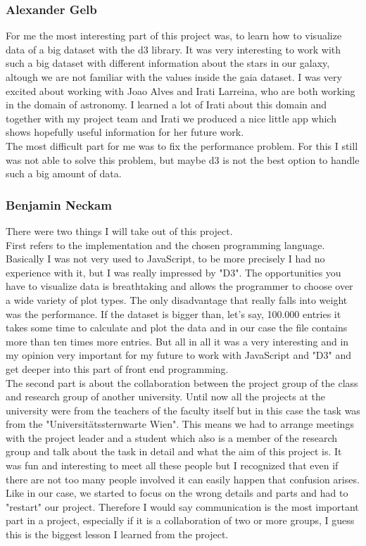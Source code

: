 \documentclass{vgtc}                          %
\begin{document}
\subsubsection{Alexander Gelb}
For me the most interesting part of this project was, to learn how to visualize data of a big dataset with the d3 library. It was very interesting to work with such a big dataset with different information about the stars in our galaxy, altough we are not familiar with the values inside the gaia dataset. I was very excited about working with Joao Alves and Irati Larreina, who are both working in the domain of astronomy. I learned a lot of Irati about this domain and together with my project team and Irati we produced a nice little app which shows hopefully useful information for her future work. \\
The most difficult part for me was to fix the performance problem. For this I still was not able to solve this problem, but maybe  d3 is not the best option to handle such a big amount of data.
\subsubsection{Benjamin Neckam}
There were two things I will take out of this project.\\
First refers to the implementation and the chosen programming language. Basically I was not very used to JavaScript, to be more precisely I had no experience with it, but I was really impressed by "D3". The opportunities you have to visualize data is breathtaking and allows the programmer to choose over a wide variety of plot types. The only disadvantage that really falls into weight was the performance. If the dataset is bigger than, let's say, 100.000 entries it takes some time to calculate and plot the data and in our case the file contains more than ten times more entries. But all in all it was a very interesting and in my opinion very important for my future to work with JavaScript and "D3" and get deeper into this part of front end programming.\\
The second part is about the collaboration between the project group of the class and research group of another university. Until now all the projects at the university were from the teachers of the faculty itself but in this case the task was from the "Universitätssternwarte Wien". This means we had to arrange meetings with the project leader and a student which also is a member of the research group and talk about the task in detail and what the aim of this project is. It was fun and interesting to meet all these people but I recognized that even if there are not too many people involved it can easily happen that confusion arises. Like in our case, we started to focus on the wrong details and parts and had to "restart" our project. Therefore I would say communication is the most important part in a project, especially if it is a collaboration of two or more groups, I guess this is the biggest lesson I learned from the project. 
\end{document}
